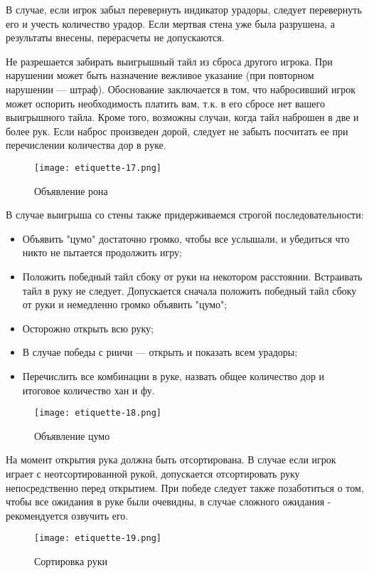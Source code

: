 В случае, если игрок забыл перевернуть индикатор урадоры, следует перевернуть его и учесть количество урадор. Если мертвая стена уже была разрушена, а результаты внесены, перерасчеты не допускаются.

Не разрешается забирать выигрышный тайл из сброса другого игрока. При нарушении может быть назначение вежливое указание (при повторном нарушении --- штраф). Обоснование заключается в том, что набросивший игрок может оспорить необходимость платить вам, т.к. в его сбросе нет вашего выигрышного тайла. Кроме того, возможны случаи, когда тайл наброшен в две и более рук. Если наброс произведен дорой, следует не забыть посчитать ее при перечислении количества дор в руке.

\begin{figure}[H]
	\centering
	\texttt{[image: etiquette-17.png]}
	\caption{Объявление рона}
\end{figure}

В случае выигрыша со стены также придерживаемся строгой последовательности:

\begin{itemize}
	\item Объявить "цумо" достаточно громко, чтобы все услышали, и убедиться что никто не пытается продолжить игру;
	\item Положить победный тайл сбоку от руки на некотором расстоянии. Встраивать тайл в руку не следует. Допускается сначала положить победный тайл сбоку от руки и немедленно громко объявить "цумо";
	\item Осторожно открыть всю руку;
	\item В случае победы с риичи --- открыть и показать всем урадоры;
	\item Перечислить все комбинации в руке, назвать общее количество дор и итоговое количество хан и фу.
\end{itemize}

\begin{figure}[H]
	\centering
	\texttt{[image: etiquette-18.png]}
	\caption{Объявление цумо}
\end{figure}

На момент открытия рука должна быть отсортирована. В случае если игрок играет с неотсортированной рукой, допускается отсортировать руку непосредственно перед открытием. При победе следует также позаботиться о том, чтобы все ожидания в руке были очевидны, в случае сложного ожидания - рекомендуется озвучить его.

\begin{figure}[H]
	\centering
	\texttt{[image: etiquette-19.png]}
	\caption{Сортировка руки}
\end{figure}

